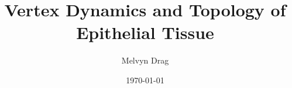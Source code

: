 \documentclass[11pt]{report}
\title{\textbf{Vertex Dynamics and Topology of Epithelial Tissue}}
\author{Melvyn Drag}
\date{\today}
\begin{document}
\maketitle
\clearpage
\tableofcontents{}











\end{document}
